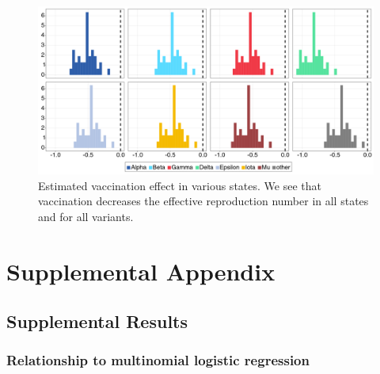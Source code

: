 \documentclass[11pt,oneside,letterpaper]{article}
\begin{document}
\begin{figure}
  \centering
  \includegraphics[width=\linewidth]{figs/fig_5_vaccination_effect.png}
  \caption{Estimated vaccination effect in various states.
  We see that vaccination decreases the effective reproduction number in all states and for all variants.}%
  \label{fig:5}
\end{figure}




\newpage
\appendix

\section*{Supplemental Appendix}

\subsection*{Supplemental Results}

\subsubsection*{Relationship to multinomial logistic regression}
\end{document}
